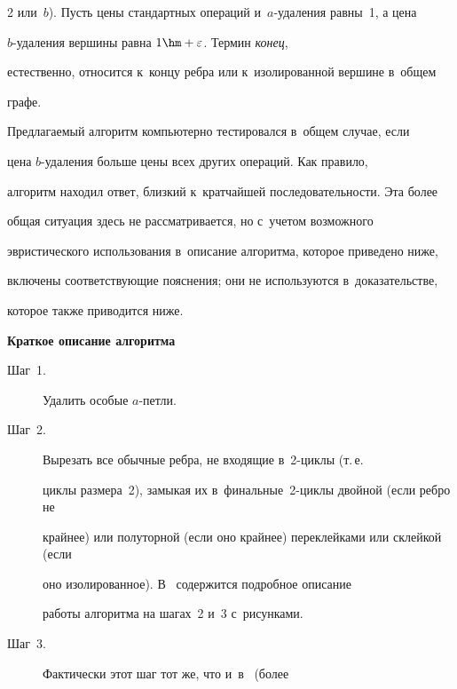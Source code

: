 \begin{multicols}{2}
или~$b$). Пусть цены стандартных операций и~$a$-уда\-ле\-ния равны~1, а цена 


$b$-уда\-ле\-ния вершины равна $1\hm+\varepsilon$. Термин \textit{конец}, 


естественно, относится к~концу реб\-ра или к~изолированной вершине в~общем 


графе. 


  


  Предлагаемый алгоритм компьютерно тестировался в~общем случае, если 


цена $b$-уда\-ле\-ния больше цены всех других операций. Как правило, 


алгоритм находил ответ, близкий к~кратчайшей последовательности. Эта более 


общая ситуация здесь не рассматривается, но с~учетом возможного 


эвристического использования в~описание алгоритма, которое приведено ниже, 


включены соответствующие пояснения; они не используются в~доказательстве, 


которое также приводится ниже. 


  


\pagebreak 


  


  \textbf{Краткое описание алгоритма}


  


  \begin{description}


  \item[Шаг~1.] Удалить особые $a$-петли. 


  \item[Шаг~2.] Вырезать все обычные реб\-ра, не входящие в~2-цик\-лы (т.\,е.\ 


циклы размера~2), замыкая их в~финальные~2-цик\-лы двойной (если ребро не 


крайнее) или полуторной (если оно крайнее) переклейками или склейкой (если 


оно изолированное). В~\cite[п.~4]{1-gor} содержится подробное описание 


работы алгоритма на шагах~2 и~3 с~рисунками.


  \item[Шаг~3.] Фактически этот шаг тот же, что и~в~\cite{2-gor} (более 



\end{description}
\end{multicols}
